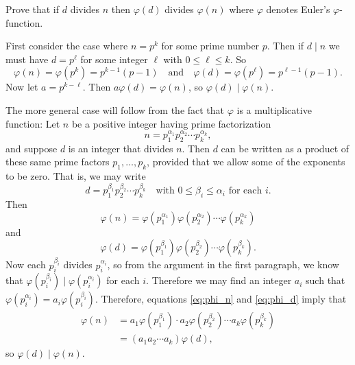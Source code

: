  Prove that if $d$ divides $n$ then $\varphi(d)$ divides
$\varphi(n)$ where $\varphi$ denotes Euler's $\varphi$-function.
\begin{solution}
  First consider the case where $n = p^k$ for some prime number
  $p$. Then if $d\mid n$ we must have $d = p^\ell$ for some integer
  $\ell$ with $0\leq\ell\leq k$. So
  \begin{equation*}
    \varphi(n) = \varphi(p^k) = p^{k-1}(p - 1)
    \quad\text{and}\quad
    \varphi(d) = \varphi(p^\ell) = p^{\ell-1}(p - 1).
  \end{equation*}
  Now let $a = p^{k - \ell}$. Then $a\varphi(d) = \varphi(n)$, so
  $\varphi(d)\mid\varphi(n)$.

  The more general case will follow from the fact that $\varphi$ is a
  multiplicative function: Let $n$ be a positive integer having prime
  factorization
  \begin{equation*}
    n = p_1^{\alpha_1}p_2^{\alpha_2}\cdots p_k^{\alpha_k},
  \end{equation*}
  and suppose $d$ is an integer that divides $n$. Then $d$ can be
  written as a product of these same prime factors $p_1,\ldots,p_k$,
  provided that we allow some of the exponents to be zero. That is, we
  may write
  \begin{equation*}
    d = p_1^{\beta_1}p_2^{\beta_2}\cdots p_k^{\beta_k}
    \quad\text{with $0\leq\beta_i\leq\alpha_i$ for each $i$.}
  \end{equation*}
  Then
  \begin{equation}
    \label{eq:phi_n}
    \varphi(n) = \varphi(p_1^{\alpha_1})\varphi(p_2^{\alpha_2})\cdots
    \varphi(p_k^{\alpha_k})
  \end{equation}
  and
  \begin{equation}
    \label{eq:phi_d}
    \varphi(d) = \varphi(p_1^{\beta_1})\varphi(p_2^{\beta_2})\cdots
    \varphi(p_k^{\beta_k}).
  \end{equation}
  Now each $p_i^{\beta_i}$ divides $p_i^{\alpha_i}$, so from the
  argument in the first paragraph, we know that
  $\varphi(p_i^{\beta_i}) \mid \varphi(p_i^{\alpha_i})$ for each
  $i$. Therefore we may find an integer $a_i$ such that
  $\varphi(p_i^{\alpha_i}) = a_i\varphi(p_i^{\beta_i})$. Therefore,
  equations \eqref{eq:phi_n} and \eqref{eq:phi_d} imply that
  \begin{align*}
    \varphi(n) &= a_1\varphi(p_1^{\beta_1})
                 \cdot a_2\varphi(p_2^{\beta_2})
                 \cdots a_k\varphi(p_k^{\beta_k}) \\
               &= (a_1a_2\cdots a_k)\varphi(d),
  \end{align*}
  so $\varphi(d) \mid \varphi(n)$.
\end{solution}
